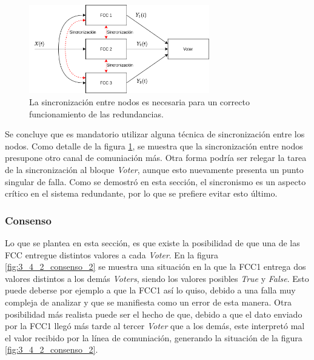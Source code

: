 \begin{figure}[H]
    \centering
    \includegraphics[width=0.7\textwidth]{img/3_4_1_sincronizacion_3.png}
    \caption{La sincronización entre nodos es necesaria para un correcto funcionamiento de las redundancias.}
    \label{fig:3_4_1_sincronizacion_3}
\end{figure}

Se concluye que es mandatorio utilizar alguna técnica de sincronización entre los nodos. Como detalle de la figura \ref{fig:3_4_1_sincronizacion_3}, se muestra que la sincronización entre nodos presupone otro canal de comuniación más. Otra forma podría ser relegar la tarea de la sincronización al bloque \textit{Voter}, aunque esto nuevamente presenta un punto singular de falla. Como se demostró en esta sección, el sincronismo es un aspecto crítico en el sistema redundante, por lo que se prefiere evitar esto último.

\subsubsection{Consenso}

Lo que se plantea en esta sección, es que existe la posibilidad de que una de las FCC entregue distintos valores a cada \textit{Voter}. En la figura \ref{fig:3_4_2_consenso_2} se muestra una situación en la que la FCC1 entrega dos valores distintos a los demás \textit{Voters}, siendo los valores posibles \textit{True} y \textit{False}. Esto puede deberse por ejemplo a que la FCC1 así lo quiso, debido a una falla muy compleja de analizar y que se manifiesta como un error de esta manera. Otra posibilidad más realista puede ser el hecho de que, debido a que el dato enviado por la FCC1 llegó más tarde al tercer \textit{Voter} que a los demás, este interpretó mal el valor recibido por la línea de comuniación, generando la situación de la figura \ref{fig:3_4_2_consenso_2}. 

